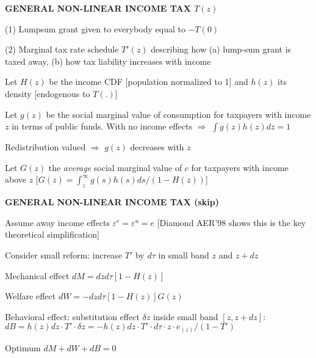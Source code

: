 \documentclass[landscape]{slides}
\begin{document}
\begin{slide}
\begin{center}
{\bf GENERAL NON-LINEAR INCOME TAX $T(z)$}
\end{center}
(1) Lumpsum grant given to everybody equal to $-T(0)$

(2) Marginal tax rate schedule $T'(z)$ describing how (a) lump-sum
grant is taxed away, (b) how tax liability increases with income

Let $H(z)$ be the income CDF [population normalized to 1] and
$h(z)$ its density [endogenous to $T(.)$]

Let $g(z)$ be the social marginal value of consumption for
taxpayers with income $z$ in terms of public funds.
With no income effects $\Rightarrow$
$\int g(z)h(z)dz=1$

Redistribution valued $\Rightarrow$ $g(z)$ decreases with $z$

Let $G(z)$ the {\em average} social marginal value of $c$ for
taxpayers with income above $z$ [$G(z)=\int_z^{\infty}
g(s)h(s)ds/(1-H(z))$]
\end{slide}


\begin{slide}

\end{slide}

\begin{slide}
\begin{center}
{\bf GENERAL NON-LINEAR INCOME TAX (skip)}
\end{center}
Assume away income effects $\varepsilon^c = \varepsilon^u
=e$ [Diamond AER'98 shows this is the key theoretical
simplification]

Consider small reform: increase $T'$ by $d\tau$ in small band $z$
and $z+dz$

Mechanical effect $dM=dz d\tau [1-H(z)]$

Welfare effect $dW=-dz d\tau [1-H(z)]G(z)$

Behavioral effect: substitution effect $\delta z$ inside small
band $[z,z+dz]$: $dB=h(z)dz \cdot T' \cdot \delta z = -h(z)dz
\cdot T' \cdot d\tau \cdot z \cdot e_{(z)}/(1-T')$

Optimum $dM+dW+dB=0$

\end{slide}
\end{document}
